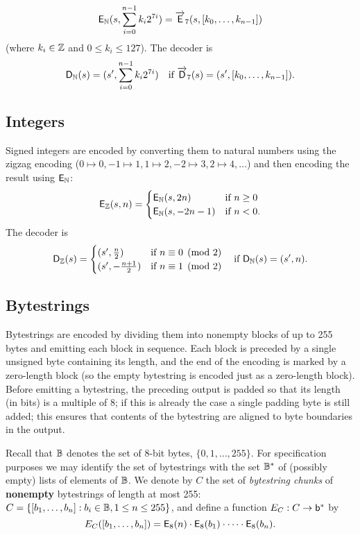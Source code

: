 $$
\mathsf{E}_{\mathbb{N}} (s, \sum_{i=0}^{n-1}k_i2^{7i}) = \overrightarrow{\mathsf{E}}_7(s, [k_0, \ldots, k_{n-1}])
$$
\noindent(where $k_i \in \mathbb{Z}$ and $0 \leq k_i \leq 127$).
\noindent The decoder is
$$
\mathsf{D}_{\mathbb{N}}(s) = (s', \sum_{i=0}^{n-1}k_i2^{7i}) \quad \text{if $\overrightarrow{\mathsf{D}}_7(s) = (s', [k_0, \ldots, k_{n-1}])$}.
$$

\subsection{Integers}
Signed integers are encoded by converting them to natural numbers using the
zigzag encoding ($0 \mapsto 0, -1 \mapsto 1, 1 \mapsto 2, -2 \mapsto 3, 2
\mapsto 4, \ldots$) and then encoding the result using $\mathsf{E}_{\mathbb{N}}$:
$$
\mathsf{E}_{\mathbb{Z}} (s, n) =
\begin{cases}
  \mathsf{E}_{\mathbb{N}}(s, 2n) & \text{if $n \geq 0$}\\
  \mathsf{E}_{\mathbb{N}}(s, -2n-1) & \text{if $n < 0$}.
\end{cases}
$$
The decoder is
$$
\mathsf{D}_{\mathbb{Z}}(s) =
\begin{cases}
  (s', \frac{n}{2}) & \text{if $n \equiv 0 \pmod 2$}\\
  (s', -\frac{n+1}{2}) & \text{if $n \equiv 1 \pmod 2$}
\end{cases} \quad\text{if $\mathsf{D}_{\mathbb{N}}(s) = (s', n)$}.
$$

\subsection{Bytestrings}  Bytestrings are encoded by dividing them into
nonempty blocks of up to 255 bytes and emitting each block in sequence.  Each
block is preceded by a single unsigned byte containing its length, and the end
of the encoding is marked by a zero-length block (so the empty bytestring is
encoded just as a zero-length block).  Before emitting a bytestring, the
preceding output is padded so that its length (in bits) is a multiple of 8; if
this is already the case a single padding byte is still added; this ensures that
contents of the bytestring are aligned to byte boundaries in the output.

Recall that $\mathbb{B}$ denotes the set of 8-bit bytes, $\{0,1, \ldots, 255\}$. For
specification purposes we may identify the set of bytestrings with the set
$\mathbb{B}^*$ of (possibly empty) lists of elements of $\mathbb{B}$.  We denote by $C$ the set
of \textit{bytestring chunks} of \textbf{nonempty} bytestrings of length at most
255: $C = \{[b_1, \ldots, b_n]: b_i \in \mathbb{B}, 1 \leq n \leq 255\}$, and define a
function $E_C: C \rightarrow \mathsf{b}^*$ by
$$
E_C ([b_1, \ldots, b_n]) = \mathsf{E}_8(n) \cdot \mathsf{E}_8(b_1) \cdot \cdots \cdot \mathsf{E}_8(b_n).
$$

